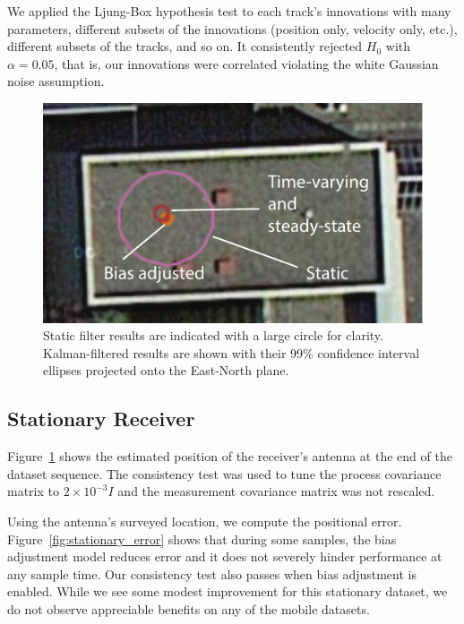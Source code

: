 We applied the Ljung-Box hypothesis test to each track's innovations with many parameters, different subsets of the innovations (position only, velocity only, etc.), different subsets of the tracks, and so on.  It consistently rejected $H_0$ with $\alpha = 0.05$, that is, our innovations were correlated violating the white Gaussian noise assumption.

\begin{figure}
\includegraphics[width=\columnwidth]{stationary_map}
\caption{Static filter results are indicated with a large circle for clarity.  Kalman-filtered results are shown with their 99\% confidence interval ellipses projected onto the East-North plane.}
\label{fig:stationary_map} 
\end{figure}


\subsection{Stationary Receiver}
Figure~\ref{fig:stationary_map} shows the estimated position of the receiver's antenna at the end of the dataset sequence.  The consistency test was used to tune the process covariance matrix to $2\times10^{-3}I$ and the measurement covariance matrix was not rescaled.

Using the antenna's surveyed location, we compute the positional error.  Figure~\ref{fig:stationary_error} shows that during some samples, the bias adjustment model reduces error and it does not severely hinder performance at any sample time.  Our consistency test also passes when bias adjustment is enabled.  While we see some modest improvement for this stationary dataset, we do not observe appreciable benefits on any of the mobile datasets.

